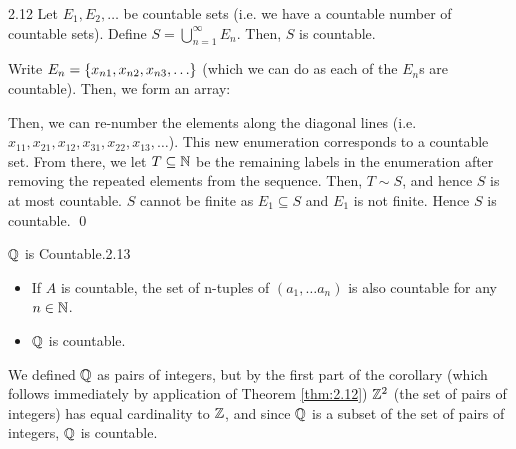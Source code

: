 \begin{theorem}{}{2.12}
    Let $E_1, E_2, \ldots$ be countable sets (i.e. we have a countable number of countable sets). Define $S = \bigcup_{n=1}^{\infty} E_n$. Then, $S$ is countable. 
\end{theorem}
\begin{nproof}
    Write $E_n = \set{x_{n1}, x_{n2}, x_{n3}, \ldots}$ (which we can do as each of the $E_n$s are countable). Then, we form an array:
    \begin{center}
    \end{center}
    Then, we can re-number the elements along the diagonal lines (i.e. $x_{11}, x_{21}, x_{12}, x_{31}, x_{22}, x_{13}, \ldots$). This new enumeration corresponds to a countable set. From there, we let $T \subseteq \mathbb{N}$ be the remaining labels in the enumeration after removing the repeated elements from the sequence. Then, $T \sim S$, and hence $S$ is at most countable. $S$ cannot be finite as $E_1 \subseteq S$ and $E_1$ is not finite. Hence $S$ is countable. \qed
\end{nproof}

\begin{corollary}{$\mathbb{Q}$ is Countable.}{2.13}
    \begin{itemize}
        \item If $A$ is countable, the set of n-tuples of $(a_1, \ldots a_n)$ is also countable for any $n \in \mathbb{N}$.  
        \item $\mathbb{Q}$ is countable.
    \end{itemize}
\end{corollary}
\noindent We defined $\mathbb{Q}$ as pairs of integers, but by the first part of the corollary (which follows immediately by application of Theorem \ref{thm:2.12}) $\mathbb{Z}^2$ (the set of pairs of integers) has equal cardinality to $\mathbb{Z}$, and since $\mathbb{Q}$ is a subset of the set of pairs of integers, $\mathbb{Q}$ is countable. 

